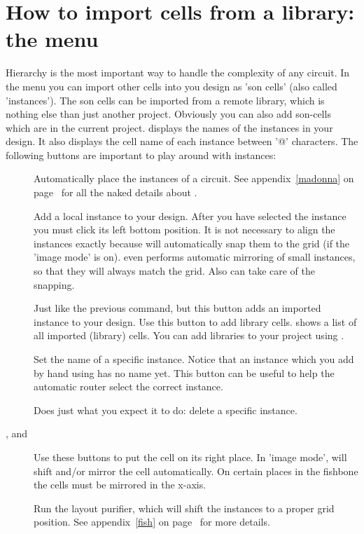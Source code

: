 \section{How to import cells from a library: the \protect{} menu}
\label{instances}
Hierarchy is the most important way to handle the complexity of any
circuit. In the  menu you can import other cells into
you design as 'son cells' (also called 'instances').  The son cells can
be imported from a remote library, which is nothing else than just
another project. Obviously you can also add son-cells which are in the
current project. 
 displays the names of the instances in your design.
It also displays the cell name of each instance between '@' characters.
The following buttons are important to play around with instances:
\begin{description}
\item[]
Automatically place the instances of a circuit.
See appendix~\ref{madonna} on page~\pageref{madonna} for 
all the naked details about .
\item[]
Add a local instance to your design. After you have selected the instance
you must click its left bottom position. It is not necessary
to align the instances exactly because  will
automatically snap them to the grid (if the 'image mode' is on). 
even performs automatic mirroring of small instances, so that they will
always match the grid. Also  can take care of the snapping.
\item[]
Just like the previous command, but this button adds an imported
instance to your design. Use this button to add library cells. 
shows a list of all imported (library) cells. You can add libraries to your
project using .
\item[]
Set the name of a specific instance. Notice that an instance which you
add by hand using  has no name yet. This button can be
useful to help the automatic router select the correct instance.
\item[]
Does just what you expect it to do: delete a specific instance.
\item[,  and ]
Use these buttons to put the cell on its right place. In 'image mode',
 will shift and/or mirror the cell automatically. 
On certain places in the fishbone the cells must be mirrored in the
x-axis.
\item[]
Run the layout purifier, which will shift the instances to
a proper grid position. See appendix~\ref{fish} on page~\pageref{fish}
for more details.
\end{description}

